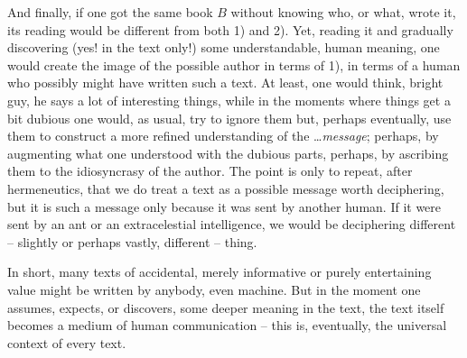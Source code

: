And finally, if one got the same book $B$ without knowing who, or what, wrote
it, its reading would be different from both 1) and 2).  Yet, reading it and
gradually discovering (yes!  in the text only!)  some understandable, human
meaning, one would create the image of the possible author in terms of 1), in
terms of a human who possibly might have written such a text.  At least, one
would think, bright guy, he says a lot of interesting things, while in the
moments where things get a bit dubious one would, as usual, try to ignore them
but, perhaps eventually, use them to construct a more refined understanding of
the \ldots {\em message}; perhaps, by augmenting what one understood with the
dubious parts, perhaps, by ascribing them to the idiosyncrasy of the author.
The point is only to repeat, after hermeneutics, that we do treat a text as a
possible message worth deciphering, but it is such a message only because it was
sent by another human. If it were sent by an ant or an extracelestial intelligence, we would be deciphering different
-- slightly or perhaps vastly, different -- thing.

In short, many texts of accidental, merely informative or purely entertaining
value might be written by anybody, even machine.  But in the moment one assumes,
expects, or discovers, some deeper meaning in the text, the text itself becomes
a medium of human communication -- this is, eventually, the universal context of
every text.


